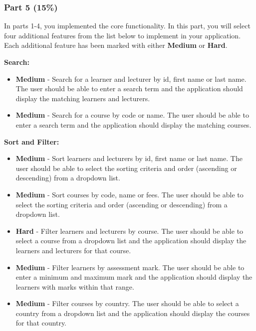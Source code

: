 \documentclass{article}
\begin{document}
\subsubsection*{Part 5 (15\%)}

In parts 1-4, you implemented the core functionality. In this part, you will select four additional features from the list below to implement in your application. Each additional feature has been marked with either \textbf{Medium} or \textbf{Hard}.

\textbf{Search:}
\begin{itemize}
    \item \textbf{Medium} - Search for a learner and lecturer by id, first name or last name. The user should be able to enter a search term and the application should display the matching learners and lecturers. 
    \item \textbf{Medium} - Search for a course by code or name. The user should be able to enter a search term and the application should display the matching courses.
\end{itemize}

\textbf{Sort and Filter:}
\begin{itemize}
    \item \textbf{Medium} - Sort learners and lecturers by id, first name or last name. The user should be able to select the sorting criteria and order (ascending or descending) from a dropdown list.    
    \item \textbf{Medium} - Sort courses by code, name or fees. The user should be able to select the sorting criteria and order (ascending or descending) from a dropdown list.
    \item \textbf{Hard} - Filter learners and lecturers by course. The user should be able to select a course from a dropdown list and the application should display the learners and lecturers for that course.
    \item \textbf{Medium} - Filter learners by assessment mark. The user should be able to enter a minimum and maximum mark and the application should display the learners with marks within that range.
    \item \textbf{Medium} - Filter courses by country. The user should be able to select a country from a dropdown list and the application should display the courses for that country.
\end{itemize}
\end{document}
